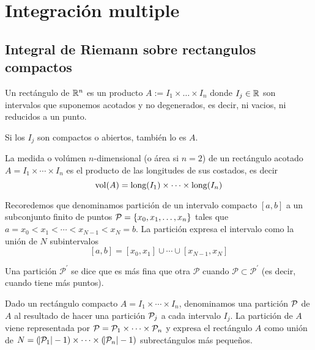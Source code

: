 \section{Integración multiple}


\subsection{Integral de Riemann sobre rectangulos compactos}

\begin{defi}
	Un rectángulo de $\mathbb{R}^n$ es un producto $A := I_1 \times \dots \times I_n$
	donde $I_j \in \mathbb{R}$ son intervalos que suponemos acotados y no degenerados,
	es decir, ni vacios, ni reducidos a un punto.
	
	Si los $I_j$ son compactos o abiertos, también lo es $A$.
\end{defi}

\begin{defi}
	La medida o volúmen $n$-dimensional (o área si $n=2$) de un rectángulo
	acotado $A = I_1 \times \cdots \times I_n$ es el producto de las longitudes
	de sus costados, es decir
	\[
		\operatorname{vol}(A) = \text{long} (I_1) \times \dots \times \text{long} (I_n)
	\]
\end{defi}

\begin{obs}
	Recoredemos que denominamos partición de un intervalo compacto $[a,b]$ a un
	subconjunto finito de puntos $\mathcal{P}=\left\{x_0,x_1,\dots,x_n\right\}$ tales que
	$a = x_0 < x_1 < \cdots < x_{N-1} < x_N = b$. La partición expresa el intervalo
	como la unión de $N$ subintervalos
	\[
		[a,b] = [x_0,x_1] \cup \cdots \cup [x_{N-1},x_N]
	\]
\end{obs}
\begin{obs*}
	Una partición $\mathcal{P}^\prime$ se dice que es más fina que otra
	$\mathcal{P}$ cuando $\mathcal{P} \subset \mathcal{P}^\prime$ (es decir, cuando
	tiene más puntos).
\end{obs*}

\begin{defi}
	Dado un rectángulo compacto $A = I_1 \times \cdots \times I_n$, denominamos
	una partición $\mathcal{P}$ de $A$ al resultado de hacer una partición $\mathcal{P}_j$ a cada
	intervalo $I_j$.
	La partición de $A$ viene representada por $\mathcal{P} = \mathcal{P}_1 \times \cdots \times
	\mathcal{P}_n$ y expresa el rectángulo $A$ como unión de $N = (\abs{\mathcal{P}_1}-1) \times
	\cdots \times (\abs{\mathcal{P}_n}-1)$ subrectángulos más pequeños.
\end{defi}

